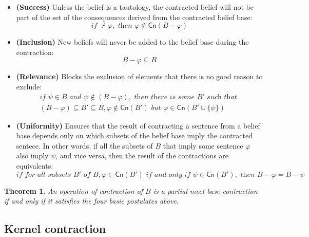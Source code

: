 \begin{itemize}
    \item[] \textbf{(Success)} Unless the belief is a tautology, the contracted belief will not be part of the set of the consequences derived from the contracted belief base:
    $$\textit{if } \nvdash \varphi, \textit{ then } \varphi \notin \textsf{Cn}(B - \varphi)$$

    \item[] \textbf{(Inclusion)} New beliefs will never be added to the belief base during the contraction:
    $$B - \varphi \subseteq B$$

    \item[] \textbf{(Relevance)} Blocks the exclusion of elements that there is no good reason to exclude:
    \begin{equation*}
        \begin{split}
            \textit{if } \psi \in B \textit{ and } \psi \notin  (B - \varphi), \textit{ then there is some } B' \textit{ such that }  \\
                (B - \varphi) \subseteq B' \subseteq B, \varphi \notin \textsf{Cn}(B') \textit{ but } \varphi \in \textsf{Cn}(B' \cup \{ \psi \})
        \end{split}
    \end{equation*}

    \item[] \textbf{(Uniformity)} Ensures that the result of contracting a sentence from a belief base depends only on which subsets of the belief base imply the contracted sentece. In other words, if all the subsets of $B$ that imply some sentence $\varphi$ also imply $\psi$, and vice versa, then the result of the contractions are equivalents:
    $$\textit{if for all subsets } B' \textit{ of } B, \varphi \in \textsf{Cn}(B') \textit{ if and only if } \psi \in \textsf{Cn}(B'), \textit{ then } B - \varphi = B - \psi$$
\end{itemize}

\newtheorem{theorem}{Theorem}[chapter]

\begin{theorem}
    An operation of contraction of $B$ is a \textit{partial meet base contraction} if and only if it satisfies the four basic postulates above.    
\end{theorem}

\subsection{Kernel contraction}
\label{subsec:kernel-contraction}

